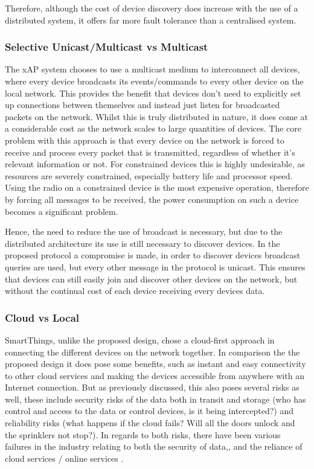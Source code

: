 Therefore, although the cost of device discovery does increase with the use of a distributed system, it offers far more fault tolerance than a centralised system.


\subsubsection{Selective Unicast/Multicast vs Multicast} %
\label{ssub:selective_unicast_multicast_vs_multicast}
The xAP system chooses to use a multicast medium to interconnect all devices, where every device broadcasts its events/commands to every other device on the local network. This provides the benefit that devices don't need to explicitly set up connections between themselves and instead just listen for broadcasted packets on the network. Whilst this is truly distributed in nature, it does come at a considerable cost as the network scales to large quantities of devices. The core problem with this approach is that every device on the network is forced to receive and process every packet that is transmitted, regardless of whether it's relevant information or not. For constrained devices this is highly undesirable, as resources are severely constrained, especially battery life and processor speed. Using the radio on a constrained device is the most expensive operation, therefore by forcing all messages to be received, the power consumption on such a device becomes a significant problem. 

Hence, the need to reduce the use of broadcast is necessary, but due to the distributed architecture its use is still necessary to discover devices. In the proposed protocol a compromise is made, in order to discover devices broadcast queries are used, but every other message in the protocol is unicast. This ensures that devices can still easily join and discover other devices on the network, but without the continual cost of each device receiving every devices data.


\subsubsection{Cloud vs Local} %
\label{ssub:cloud_vs_local}
SmartThings, unlike the proposed design, chose a cloud-first approach in connecting the different devices on the network together. In comparison the the proposed design it does pose some benefits, such as instant and easy connectivity to other cloud services and making the devices accessible from anywhere with an Internet connection. But as previously discussed, this also poses several risks as well, these include security risks of the data both in transit and storage (who has control and access to the data or control devices, is it being intercepted?) and reliability risks (what happens if the cloud fails? Will all the doors unlock and the sprinklers not stop?). In regards to both risks, there have been various failures in the industry relating to both the security of data,\cite{Playstation}, and the reliance of cloud services / online services \cite{Amazon, Google}. 

